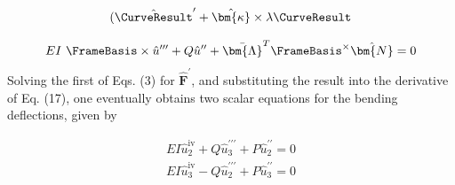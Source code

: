 $$
(\hat{\CurveResult}' + \hat{\bm{\kappa}} \times \lambda \CurveResult
$$


$$
EI ~\FrameBasis \times \hat{u}^{\prime \prime \prime}+ Q \hat{u}^{\prime \prime}+  \bar{\bm{\Lambda}}^T \FrameBasis^{\times} \hat{\bm{N}}=0
$$
Solving the first of Eqs. (3) for $\hat{\boldsymbol{F}}^{\prime}$, and substituting the result into the derivative of Eq. (17), one eventually obtains two scalar equations for the bending deflections, given by

$$
\boxed{
\begin{aligned}
EI \hat{u}_2^{\mathrm{iv}} + Q \hat{u}_3^{\prime \prime \prime}+ P \hat{u}_2^{\prime \prime}=0 \\
EI \hat{u}_3^{\mathrm{iv}}- Q \hat{u}_2^{\prime \prime \prime}+ P \hat{u}_3^{\prime \prime}=0
\end{aligned}
}
$$
